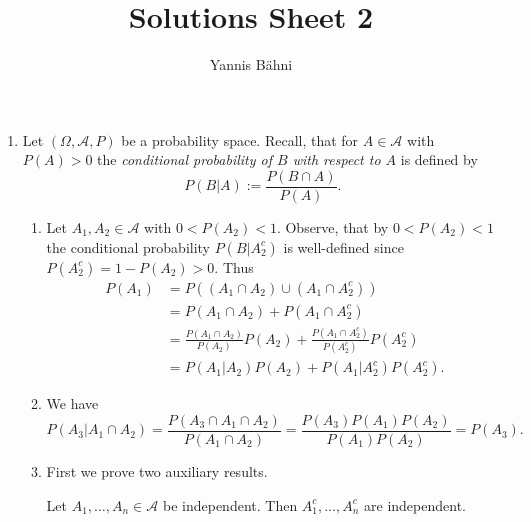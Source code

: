 

\title{Solutions Sheet 2}
\author{Yannis B\"{a}hni}
\address[Yannis B\"{a}hni]{University of Zurich, R\"{a}mistrasse 71, 8006 Zurich}


\maketitle
\thispagestyle{fancy}
\begin{enumerate}[label = \textbf{Exercise \arabic*.},wide = 0pt, itemsep=1.5ex]
	\item Let $(\Omega,\mathcal{A},P)$ be a probability space. Recall, that for $A \in \mathcal{A}$ with $P(A) > 0$ the \emph{conditional probability of $B$ with respect to $A$} is defined by
		\begin{equation}
			P(B \vert A) := \frac{P(B \cap A)}{P(A)}.
		\end{equation}
		\begin{enumerate}[label = \arabic*.,wide = 0pt, itemsep=1.5ex]
			\item Let $A_1,A_2 \in \mathcal{A}$ with $0 < P(A_2) < 1$. Observe, that by $0 < P(A_2) < 1$ the conditional probability $P(B\vert A_2^c)$ is well-defined since $P(A_2^c) = 1 - P(A_2) > 0$. Thus
				\begin{align*}
					P(A_1) &= P((A_1 \cap A_2) \cup (A_1 \cap A_2^c))\\
					&= P(A_1 \cap A_2) + P(A_1 \cap A_2^c)\\
					&= \frac{P(A_1 \cap A_2)}{P(A_2)}P(A_2) + \frac{P(A_1 \cap A_2^c)}{P(A_2^c)}P(A_2^c)\\
					&= P(A_1 \vert A_2)P(A_2) + P(A_1 \vert A_2^c)P(A_2^c).
				\end{align*}

			\item We have 
				\begin{equation*}
					P(A_3 \vert A_1 \cap A_2) = \frac{P(A_3 \cap A_1 \cap A_2)}{P(A_1 \cap A_2)} = \frac{P(A_3)P(A_1)P(A_2)}{P(A_1)P(A_2)} = P(A_3).
				\end{equation*}

			\item First we prove two auxiliary results. 
				\begin{lemma}
					Let $A_1, \dots,A_n \in \mathcal{A}$ be independent. Then $A_1^c, \dots, A_n^c$ are independent.
					\label{lem:independence_complements}
				\end{lemma}


\end{enumerate}
\end{enumerate}
